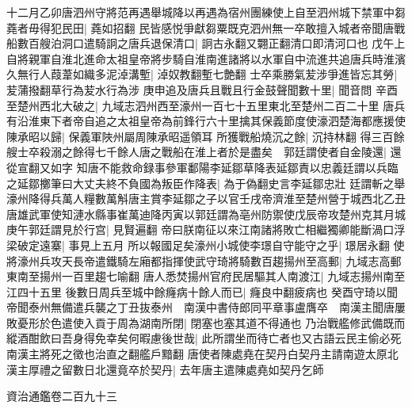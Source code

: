 十二月乙卯唐泗州守將范再遇舉城降以再遇為宿州團練使上自至泗州城下禁軍中芻蕘者毋得犯民田|{
	蕘如招翻}
民皆感悦爭獻芻粟既克泗州無一卒敢擅入城者帝聞唐戰船數百艘泊洞口遣騎詗之唐兵退保清口|{
	詗古永翻又翾正翻清口即清河口也}
戊午上自將親軍自淮北進命太祖皇帝將步騎自淮南進諸將以水軍自中流進共追唐兵時淮濱久無行人葭葦如織多泥淖溝塹|{
	淖奴教翻塹七艶翻}
士卒乘勝氣苃涉爭進皆忘其勞|{
	苃蒲撥翻草行為苃水行為涉}
庚申追及唐兵且戰且行金鼓聲聞數十里|{
	聞音問}
辛酉至楚州西北大破之|{
	九域志泗州西至濠州一百七十五里東北至楚州二百二十里}
唐兵有沿淮東下者帝自追之太祖皇帝為前鋒行六十里擒其保義節度使濠泗楚海都應援使陳承昭以歸|{
	保義軍陜州屬周陳承昭遥領耳}
所獲戰船燒沉之餘|{
	沉持林翻}
得三百餘艘士卒殺溺之餘得七千餘人唐之戰船在淮上者於是盡矣　郭廷謂使者自金陵還|{
	還從宣翻又如字}
知唐不能救命録事參軍鄱陽李延鄒草降表延鄒責以忠義廷謂以兵臨之延鄒擲筆曰大丈夫終不負國為叛臣作降表|{
	為于偽翻史言李延鄒忠壯}
廷謂斬之舉濠州降得兵萬人糧數萬斛唐主賞李延鄒之子以官壬戌帝濟淮至楚州營于城西北乙丑唐雄武軍使知漣水縣事崔萬迪降丙寅以郭廷謂為亳州防禦使戊辰帝攻楚州克其月城庚午郭廷謂見於行宫|{
	見賢遍翻}
帝曰朕南征以來江南諸將敗亡相繼獨卿能斷渦口浮梁破定遠寨|{
	事見上五月}
所以報國足矣濠州小城使李璟自守能守之乎|{
	璟居永翻}
使將濠州兵攻天長帝遣鐵騎左廂都指揮使武守琦將騎數百趨揚州至高郵|{
	九域志高郵東南至揚州一百里趨七喻翻}
唐人悉焚揚州官府民居驅其人南渡江|{
	九域志揚州南至江四十五里}
後數日周兵至城中餘癃病十餘人而已|{
	癃良中翻疲病也}
癸酉守琦以聞帝聞泰州無備遣兵襲之丁丑抜泰州　南漢中書侍郎同平章事盧膺卒　南漢主聞唐屢敗憂形於色遣使入貢于周為湖南所閉|{
	閉塞也塞其道不得通也}
乃治戰艦修武備既而縱酒酣飲曰吾身得免幸矣何暇慮後世哉|{
	此所謂坐而待亡者也又古語云民主偷必死南漢主將死之徵也治直之翻艦戶黯翻}
唐使者陳處堯在契丹白契丹主請南遊太原北漢主厚禮之留數日北還竟卒於契丹|{
	去年唐主遣陳處堯如契丹乞師}


資治通鑑卷二百九十三
